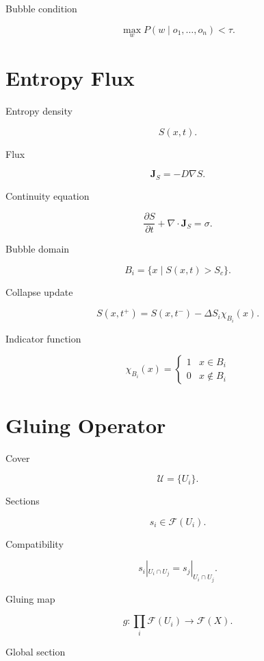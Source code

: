 \documentclass[11pt]{article}
\begin{document}
Bubble condition

\[
\max_w P(w \mid o_1,\dots,o_n) < \tau.
\]


\section{Entropy Flux}

Entropy density

\[
S(x,t).
\]

Flux

\[
\mathbf{J}_S = -D \nabla S.
\]

Continuity equation

\[
\frac{\partial S}{\partial t}
+
\nabla \cdot \mathbf{J}_S
=
\sigma.
\]

Bubble domain

\[
B_i =
\{x \mid S(x,t) > S_c\}.
\]

Collapse update

\[
S(x,t^+) =
S(x,t^-) - \Delta S_i \chi_{B_i}(x).
\]

Indicator function

\[
\chi_{B_i}(x) =
\begin{cases}
1 & x \in B_i \\
0 & x \notin B_i
\end{cases}
\]


\section{Gluing Operator}

Cover

\[
\mathcal{U} = \{U_i\}.
\]

Sections

\[
s_i \in \mathcal{F}(U_i).
\]

Compatibility

\[
s_i|_{U_i \cap U_j} =
s_j|_{U_i \cap U_j}.
\]

Gluing map

\[
g :
\prod_i \mathcal{F}(U_i)
\rightarrow
\mathcal{F}(X).
\]

Global section
\end{document}
